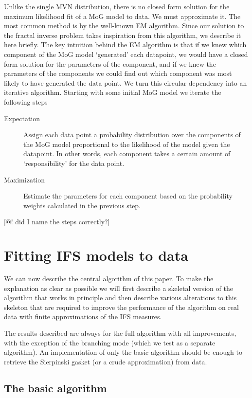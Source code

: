 \documentclass[10pt,a4paper,oneside]{article}
\theoremstyle{definition}
\begin{document}
Unlike the single MVN distribution, there is no closed form solution for the maximum likelihood fit of a MoG model to data. We must approximate it. The most common method is by the well-known EM algorithm. Since our solution to the fractal inverse problem takes inspiration from this algorithm, we describe it here briefly. The key intuition behind the EM algorithm is that if we knew which component of the MoG model `generated' each datapoint, we would have a closed form solution for the parameters of the component, and if we knew the parameters of the components we could find out which component was most likely to have generated the data point. We turn this circular dependency into an iterative algorithm. Starting with some initial MoG model we iterate the following steps

\begin{description}
  \item[Expectation] Assign each data point a probability distribution over the components of the MoG model proportional to the likelihood of the model given the datapoint. In other words, each component takes a certain amount of `responsibility' for the data point.
  \item[Maximization] Estimate the parameters for each component based on the probability weights calculated in the previous step.  
\end{description} 

[@! did I name the steps correctly?] 

\section*{Fitting IFS models to data}

We can now describe the central algorithm of this paper. To make the explanation as clear as possible we will first describe a skeletal version of the algorithm that works in principle and then describe various alterations to this skeleton that are required to improve the performance of the algorithm on real data with finite approximations of the IFS measures. 

The results described are always for the full algorithm with all improvements, with the exception of the branching mode (which we test as a separate algorithm). An implementation of only the basic algorithm should be enough to retrieve the Sierpinski gasket (or a crude approximation) from data.

\subsection*{The basic algorithm}
\end{document}
